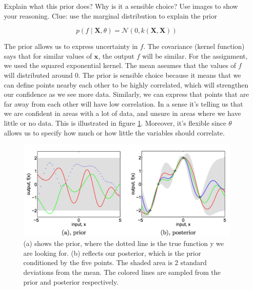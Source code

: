 \documentclass[12pt]{article}
\newenvironment{question}[2][Question]{\begin{trivlist}
\kern10pt
\item[\hskip \labelsep {\bfseries #1}\hskip \labelsep {\bfseries #2.}]}{\end{trivlist}}
\newcommand*{\answer}{%
  \par
  \kern1pt
  \begingroup
    \centering
    \raisebox{.2\baselineskip}{%
      \textcolor{gray}{
	    \rule{.6667\linewidth}{.1pt}%
      }
    }%
    \par
  \kern8pt
  \endgroup
}
\begin{document}
\begin{question}{8}
Explain what this prior does? Why is it a sensible choice? Use images to show your reasoning. Clue: use the marginal distribution to explain the prior

\answer

$$p(f \mid \boldsymbol{X}, \theta) = \mathcal{N}(0, k(\boldsymbol{X, X}))$$

The prior allows us to express uncertainty in $f$. The covariance (kernel function) says that for similar values of $\boldsymbol{x}$, the output $f$ will be similar. For the assignment, we used the squared exponential kernel. The mean assumes that the values of $f$ will distributed around 0. The prior is sensible choice because it means that we can define points nearby each other to be highly correlated, which will strengthen our confidence as we see more data. Similarly, we can express that points that are far away from each other will have low correlation. In a sense it's telling us that we are confident in areas with a lot of data, and unsure in areas where we have little or no data. This is illustrated in figure \ref{gp_prior}. Moreover, it's flexible since $\theta$ allows us to specify how much or how little the variables should correlate. 

\begin{figure}
\includegraphics[]{gp_prior}
\centering
\caption{(a) shows the prior, where the dotted line is the true function y we are looking for. (b) reflects our posterior, which is the prior conditioned by the five points. The shaded area is 2 standard deviations from the mean. The colored lines are sampled from the prior and posterior respectively.}
\label{gp_prior}
\end{figure}

\end{question}
\end{document}
